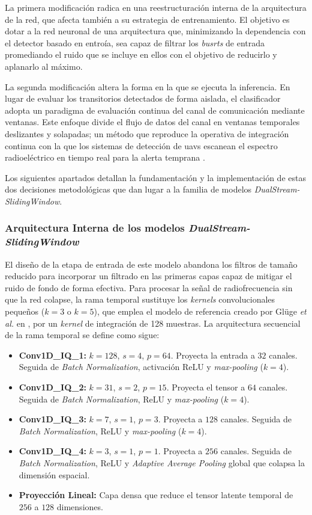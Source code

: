 La primera modificación radica en una reestructuración interna de la arquitectura de la red, que afecta también a su estrategia de entrenamiento. El objetivo es dotar a la red neuronal de una arquitectura que, minimizando la dependencia con el detector basado en entroía, sea capaz de filtrar los \textit{busrts} de entrada promediando el ruido que se incluye en ellos con el objetivo de reducirlo y aplanarlo al máximo.

La segunda modificación altera la forma en la que se ejecuta la inferencia. En lugar de evaluar los transitorios detectados de forma aislada, el clasificador adopta un paradigma de evaluación continua del canal de comunicación mediante ventanas. Este enfoque divide el flujo de datos del canal en ventanas temporales deslizantes y solapadas; un método que reproduce la operativa de integración continua con la que los sistemas de detección de \gls{uav}s escanean el espectro radioeléctrico en tiempo real para la alerta temprana \cite{ezuma_detection_2020, gluge_robust_2024}. 

Los siguientes apartados detallan la fundamentación y la implementación de estas dos decisiones metodológicas que dan lugar a la familia de modelos \textit{DualStream-SlidingWindow}.

\subsubsection{Arquitectura Interna de los modelos \textit{DualStream-SlidingWindow}}
El diseño de la etapa de entrada de este modelo abandona los filtros de tamaño reducido para incorporar un filtrado en las primeras capas capaz de mitigar el ruido de fondo de forma efectiva. Para procesar la señal de radiofrecuencia sin que la red colapse, la rama temporal sustituye los \textit{kernels} convolucionales pequeños ($k=3$ o $k=5$), que emplea el modelo de referencia creado por Glüge \textit{et al.} en \cite{gluge_robust_2024}, por un \textit{kernel} de integración de 128 muestras. La arquitectura secuencial de la rama temporal se define como sigue:
\begin{itemize}
    \item \textbf{Conv1D\_IQ\_1:} $k=128$, $s=4$, $p=64$. Proyecta la entrada a $32$ canales. Seguida de \textit{Batch Normalization}, activación ReLU y \textit{max-pooling} ($k=4$).
    \item \textbf{Conv1D\_IQ\_2:} $k=31$, $s=2$, $p=15$. Proyecta el tensor a $64$ canales. Seguida de \textit{Batch Normalization}, ReLU y \textit{max-pooling} ($k=4$).
    \item \textbf{Conv1D\_IQ\_3:} $k=7$, $s=1$, $p=3$. Proyecta a $128$ canales. Seguida de \textit{Batch Normalization}, ReLU y \textit{max-pooling} ($k=4$).
    \item \textbf{Conv1D\_IQ\_4:} $k=3$, $s=1$, $p=1$. Proyecta a $256$ canales. Seguida de \textit{Batch Normalization}, ReLU y \textit{Adaptive Average Pooling} global que colapsa la dimensión espacial.
    \item \textbf{Proyección Lineal:} Capa densa que reduce el tensor latente temporal de $256$ a $128$ dimensiones.
\end{itemize}

